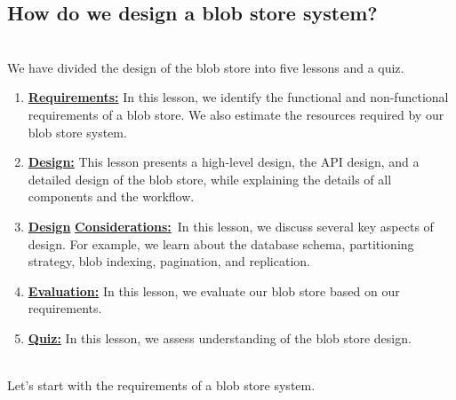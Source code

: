 \subsection{How do we design a blob store system?}\label{wI8Z8ozI8EVzgZO9o6x2o}
\\
We have divided the design of the blob store into five lessons and a quiz.

\begin{enumerate}
\item
\protect{}\label{64X0SL-QgKdiY8htgzLAj}
\href{https://www.educative.io/courses/grokking-the-system-design-interview/requirements-of-a-blob-stores-design}{\textbf{Requirements:}} In this lesson, we identify the functional and non-functional requirements of a blob store. We also estimate the resources required by our blob store system.
\item
\protect{}\label{sCSftNcTBUbXsyOltwr3x}
\href{https://www.educative.io/courses/grokking-the-system-design-interview/design-of-a-blob-store}{\textbf{Design:}} This lesson presents a high-level design, the API design, and a detailed design of the blob store, while explaining the details of all components and the workflow.
\item
\protect{}\label{MhchOsnFOHROFzPE9VuOT}
\href{https://www.educative.io/courses/grokking-the-system-design-interview/design-considerations-of-a-blob-store}{\textbf{Design}} \href{https://www.educative.io/courses/grokking-the-system-design-interview/design-considerations-of-a-blob-store}{\textbf{Considerations:}}~In this lesson, we discuss several key aspects of design. For example, we learn about the database schema, partitioning strategy, blob indexing, pagination, and replication.
\item
\protect{}\label{XY0fxBfzE2C17dv8ZtO-y}
\href{https://www.educative.io/courses/grokking-the-system-design-interview/evaluation-of-a-blob-stores-design}{\textbf{Evaluation:}} In this lesson, we evaluate our blob store based on our requirements.
\item
\protect{}\label{bS37V2LcUsnGZU0uJP7we}
\href{https://www.educative.io/courses/grokking-the-system-design-interview/quiz-on-the-blob-stores-design}{\textbf{Quiz:}} In this lesson, we assess understanding of the blob store design.
\end{enumerate}
\\
Let's start with the requirements of a blob store system.

